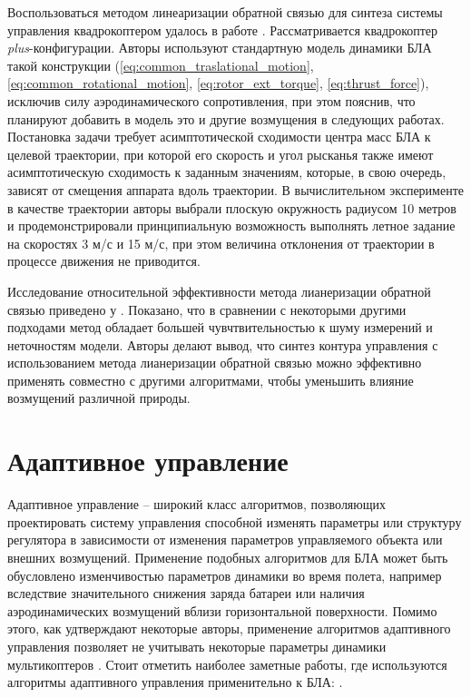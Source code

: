 Воспользоваться методом линеаризации обратной связью для синтеза системы управления квадрокоптером удалось в работе \cite{Roza01}. Рассматривается квадрокоптер \textit{plus}-конфигурации. Авторы используют стандартную модель динамики БЛА такой конструкции (\ref{eq:common_traslational_motion}, \ref{eq:common_rotational_motion}, \ref{eq:rotor_ext_torque}, \ref{eq:thrust_force}), исключив силу аэродинамического сопротивления, при этом пояснив, что планируют добавить в модель это и другие возмущения в следующих работах. Постановка задачи требует асимптотической сходимости центра масс БЛА к целевой траектории, при которой его скорость и угол рысканья также имеют асимптотическую сходимость к заданным значениям, которые, в свою очередь, зависят от смещения аппарата вдоль траектории. В вычислительном эксперименте в качестве траектории авторы выбрали плоскую окружность радиусом 10 метров и продемонстрировали принципиальную возможность выполнять летное задание на скоростях 3 м/с и 15 м/с, при этом величина отклонения от траектории в процессе движения не приводится.

Исследование относительной эффективности метода лианеризации обратной связью приведено у \cite{Lee01}. Показано, что в сравнении с некоторыми другими подходами метод обладает большей чувчтвительностью к шуму измерений и неточностям модели. Авторы делают вывод, что синтез контура управления с использованием метода лианеризации обратной связью можно эффективно применять совместно с другими алгоритмами, чтобы уменьшить влияние возмущений различной природы.

\section{Адаптивное управление}

Адаптивное управление -- широкий класс алгоритмов, позволяющих проектировать систему управления способной изменять параметры или структуру регулятора в зависимости от изменения параметров управляемого объекта или внешних возмущений.
Применение подобных алгоритмов для БЛА может быть обусловлено изменчивостью параметров динамики во время полета, например вследствие значительного снижения заряда батареи или наличия аэродинамических возмущений вблизи горизонтальной поверхности. Помимо этого, как удтверждают некоторые авторы, применение алгоритмов адаптивного управления позволяет не учитывать некоторые параметры динамики мультикоптеров \cite{Belyavskiy01}. Стоит отметить наиболее заметные работы, где используются алгоритмы адаптивного управления применительно к БЛА: \cite{Dydek01, Mu01, Bara01}.


